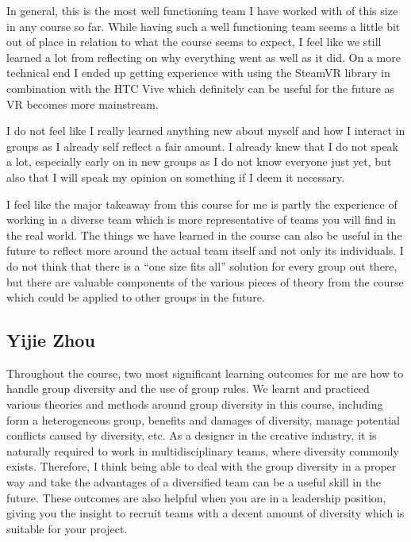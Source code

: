 In general, this is the most well functioning team I have worked with of this size in any course so far. While having such a well functioning team seems a little bit out of place in relation to what the course seems to expect, I feel like we still learned a lot from reflecting on why everything went as well as it did. On a more technical end I ended up getting experience with using the SteamVR library in combination with the HTC Vive which definitely can be useful for the future as VR becomes more mainstream. 

I do not feel like I really learned anything new about myself and how I interact in groups as I already self reflect a fair amount. I already knew that I do not speak a lot, especially early on in new groups as I do not know everyone just yet, but also that I will speak my opinion on something if I deem it necessary. 

I feel like the major takeaway from this course for me is partly the experience of working in a diverse team which is more representative of teams you will find in the real world. The things we have learned in the course can also be useful in the future to reflect more around the actual team itself and not only its individuals. I do not think that there is a “one size fits all” solution for every group out there, but there are valuable components of the various pieces of theory from the course which could be applied to other groups in the future.

\subsection{Yijie Zhou}
Throughout the course, two most significant learning outcomes for me are how to handle group diversity and the use of group rules. We learnt and practiced various theories and methods around group diversity in this course, including form a heterogeneous group, benefits and damages of diversity, manage potential conflicts caused by diversity, etc. As a designer in the creative industry, it is naturally required to work in multidisciplinary teams, where diversity commonly exists. Therefore, I think being able to deal with the group diversity in a proper way and take the advantages of a diversified team can be a useful skill in the future. These outcomes are also helpful when you are in a leadership position, giving you the insight to recruit teams with a decent amount of diversity which is suitable for your project. 

